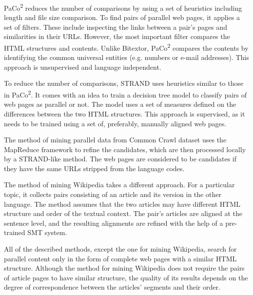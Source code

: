 PaCo\textsuperscript{2} reduces the number of comparisons by using a set of heuristics including length and file size comparison. To find pairs of parallel web pages, it applies a set of filters. These include inspecting the links between a pair's pages and similarities in their URLs. However, the most important filter compares the HTML structures and contents. Unlike Bitextor, PaCo\textsuperscript{2} compares the contents by identifying the common universal entities (e.g. numbers or e-mail addresses). This approach is unsupervised and language independent.

To reduce the number of comparisons, STRAND uses heuristics similar to those in PaCo\textsuperscript{2}. It comes with an idea to train a decision tree model to classify pairs of web pages as parallel or not. The model uses a set of measures defined on the differences between the two HTML structures. This approach is supervised, as it needs to be trained using a set of, preferably, manually aligned web pages.

The method of mining parallel data from Common Crawl dataset uses the MapReduce framework to refine the candidates, which are then processed locally by a STRAND-like method. The web pages are considered to be candidates if they have the same URLs stripped from the language codes.

The method of mining Wikipedia takes a different approach. For a particular topic, it collects pairs consisting of an article and its version in the other language. The method assumes that the two articles may have different HTML structure and order of the textual context. The pair's articles are aligned at the sentence level, and the resulting alignments are refined with the help of a pre-trained SMT system.

All of the described methods, except the one for mining Wikipedia, search for parallel content only in the form of complete web pages with a similar HTML structure. Although the method for mining Wikipedia does not require the pairs of article pages to have similar structure, the quality of its results depends on the degree of correspondence between the articles' segments and their order.
